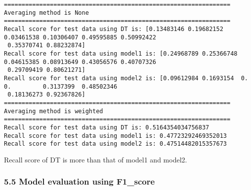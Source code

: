 \documentclass[11pt]{article}
\begin{document}
    \begin{Verbatim}[commandchars=\\\{\}]
================================================================
Averaging method is None
================================================================
Recall score for test data using DT is: [0.13483146 0.19682152 0.03461538 0.10306407 0.49595885 0.50992422
 0.35370741 0.88232874]
Recall score for test data using model1 is: [0.24968789 0.25366748 0.04615385 0.08913649 0.43056576 0.40707326
 0.29709419 0.80621271]
Recall score for test data using model2 is: [0.09612984 0.1693154  0.         0.         0.3137399  0.48502346
 0.18136273 0.92367826]
================================================================
Averaging method is weighted
================================================================
Recall score for test data using DT is: 0.5164354034756837
Recall score for test data using model1 is: 0.47723292469352013
Recall score for test data using model2 is: 0.47514482015357673

    \end{Verbatim}

    Recall score of DT is more than that of model1 and model2.

    

    \subsubsection{5.5 Model evaluation using
F1\_score}\label{model-evaluation-using-f1_score}
\end{document}
